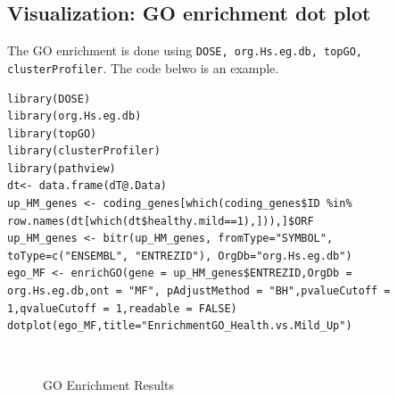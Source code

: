 \documentclass[en,black,12pt,normal]{elegantnote}
\begin{document}
\subsection{Visualization: GO enrichment dot plot}

The GO enrichment is done using \lstinline{DOSE, org.Hs.eg.db, topGO, clusterProfiler}.
The code belwo is an example.
\begin{lstlisting}
library(DOSE)
library(org.Hs.eg.db)
library(topGO)
library(clusterProfiler)
library(pathview)
dt<- data.frame(dT@.Data)
up_HM_genes <- coding_genes[which(coding_genes$ID %in% row.names(dt[which(dt$healthy.mild==1),])),]$ORF
up_HM_genes <- bitr(up_HM_genes, fromType="SYMBOL", toType=c("ENSEMBL", "ENTREZID"), OrgDb="org.Hs.eg.db")
ego_MF <- enrichGO(gene = up_HM_genes$ENTREZID,OrgDb = org.Hs.eg.db,ont = "MF", pAdjustMethod = "BH",pvalueCutoff = 1,qvalueCutoff = 1,readable = FALSE)
dotplot(ego_MF,title="EnrichmentGO_Health.vs.Mild_Up")
\end{lstlisting}

\begin{figure}[H]
    \centering
	\\
    \caption{GO Enrichment Results}
    \label{UMAP}
\end{figure}
\end{document}
